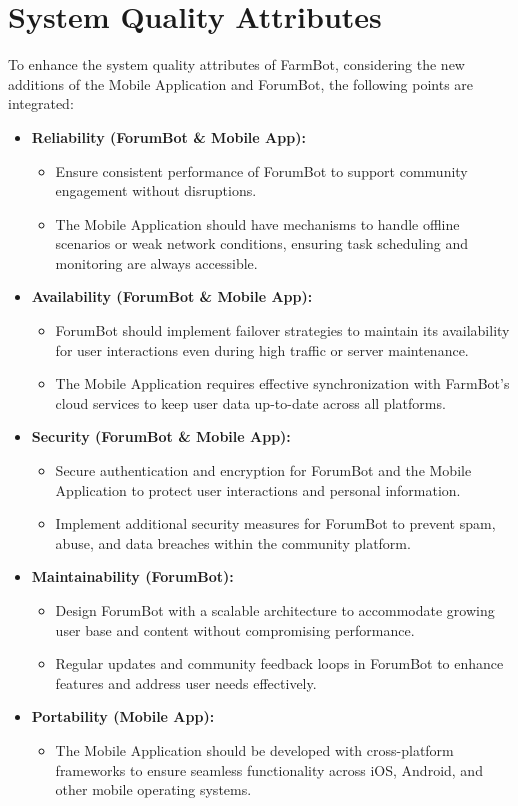 \section{System Quality Attributes}
To enhance the system quality attributes of FarmBot, considering the new additions of the Mobile Application and ForumBot, the following points are integrated:
\begin{itemize}
    \item \textbf{Reliability (ForumBot \& Mobile App):}
    \begin{itemize}
        \item Ensure consistent performance of ForumBot to support community engagement without disruptions.
        \item The Mobile Application should have mechanisms to handle offline scenarios or weak network conditions, ensuring task scheduling and monitoring are always accessible.
    \end{itemize}
    \item \textbf{Availability (ForumBot \& Mobile App):}
    \begin{itemize}
        \item ForumBot should implement failover strategies to maintain its availability for user interactions even during high traffic or server maintenance.
        \item The Mobile Application requires effective synchronization with FarmBot's cloud services to keep user data up-to-date across all platforms.
    \end{itemize}
    \item \textbf{Security (ForumBot \& Mobile App):}
    \begin{itemize}
        \item Secure authentication and encryption for ForumBot and the Mobile Application to protect user interactions and personal information.
        \item Implement additional security measures for ForumBot to prevent spam, abuse, and data breaches within the community platform.
    \end{itemize}
    \item \textbf{Maintainability (ForumBot):}
    \begin{itemize}
        \item Design ForumBot with a scalable architecture to accommodate growing user base and content without compromising performance.
        \item Regular updates and community feedback loops in ForumBot to enhance features and address user needs effectively.
    \end{itemize}
    \item \textbf{Portability (Mobile App):}
    \begin{itemize}
        \item The Mobile Application should be developed with cross-platform frameworks to ensure seamless functionality across iOS, Android, and other mobile operating systems.
    \end{itemize}
\end{itemize}
